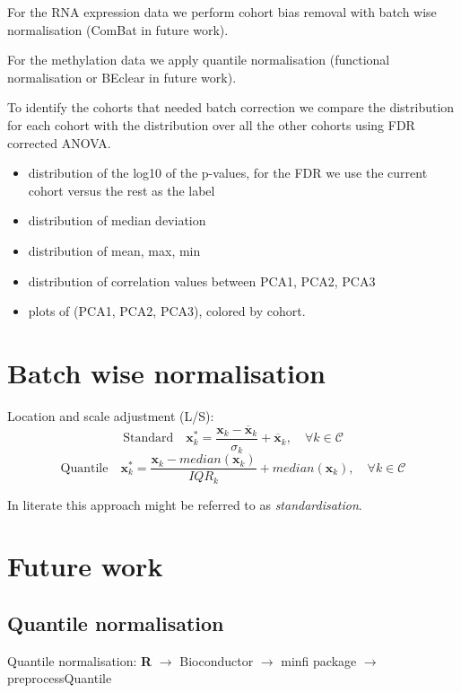 \documentclass[a4paper,10pt]{article}
\begin{document}
For the RNA expression data we perform cohort bias removal with batch wise normalisation (ComBat in future work).

For the methylation data we apply quantile normalisation (functional normalisation or BEclear in future work).

To identify the cohorts that needed batch correction we compare the distribution for each cohort 
with the distribution over all the other cohorts using FDR corrected ANOVA.

\begin{itemize}
\item distribution of the log10 of the p-values, for the FDR we use the current cohort versus the rest as the label
\item distribution of median deviation
\item distribution of mean, max, min 
\item distribution of correlation values between PCA1, PCA2, PCA3
\item plots of (PCA1, PCA2, PCA3), colored by cohort.
\end{itemize}
%

\section{Batch wise normalisation}
%
Location and scale adjustment (L/S):
\begin{equation}
\mbox{Standard}\quad \mathbf{x}^*_k= \frac{\mathbf{x}_k-\overline{\mathbf{x}}_k}{\sigma_k} + \overline{\mathbf{x}}_k,\quad \forall k\in \mathcal{C}
\end{equation}
\begin{equation}
\mbox{Quantile}\quad \mathbf{x}^*_k= \frac{\mathbf{x}_k-median{(\mathbf{x}_k)}}{IQR_k} + median{(\mathbf{x}_k)},\quad \forall k\in \mathcal{C}
\end{equation}
%

In literate this approach might be referred to as \textit{standardisation}.

\section{Future work}
\subsection{Quantile normalisation}
%
Quantile normalisation: \textbf{R} $\rightarrow$ Bioconductor $\rightarrow$ minfi package $\rightarrow$ preprocessQuantile
\end{document}
